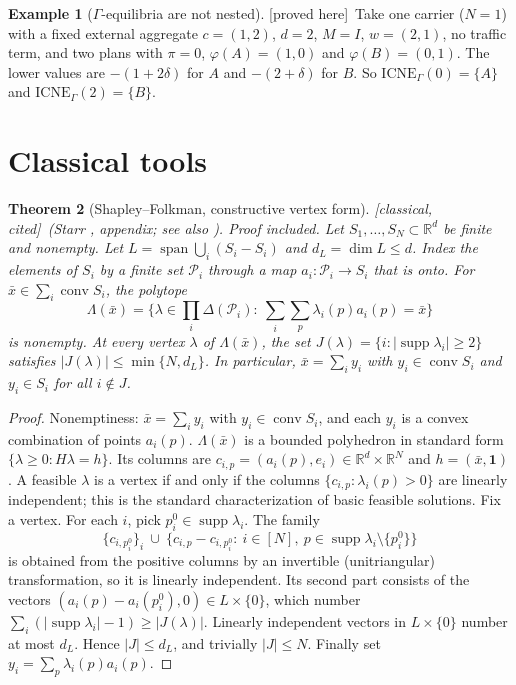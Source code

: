 \documentclass[11pt]{article}
\newtheorem{theorem}{Theorem}[section]
\theoremstyle{definition}
\newtheorem{example}[theorem]{Example}
\theoremstyle{remark}
\newcommand{\R}{\mathbb{R}}
\newcommand{\cP}{\mathcal{P}}
\newcommand{\conv}{\operatorname{conv}}
\newcommand{\spn}{\operatorname{span}}
\newcommand{\supp}{\operatorname{supp}}
\newcommand{\ICNE}{\mathrm{ICNE}}
\newcommand{\PROVED}{\textsf{[proved here]}}
\newcommand{\CLASSICAL}{\textsf{[classical, cited]}}
\begin{document}
\begin{example}[$\Gamma$-equilibria are not nested]\label{ex:gamma} \PROVED\
Take one carrier ($N=1$) with a fixed external aggregate $c=(1,2)$, $d=2$, $M=I$, $w=(2,1)$, no traffic term, and two plans with $\pi=0$, $\varphi(A)=(1,0)$ and $\varphi(B)=(0,1)$. The lower values are $-(1+2\delta)$ for $A$ and $-(2+\delta)$ for $B$. So $\ICNE_\Gamma(0)=\{A\}$ and $\ICNE_\Gamma(2)=\{B\}$.
\end{example}

\section{Classical tools}\label{sec:tools}

\begin{theorem}[Shapley--Folkman, constructive vertex form]\label{thm:sf} \CLASSICAL\ (Starr \cite{Starr69}, appendix; see also \cite{Zhou93,UB16}). Proof included.
Let $S_1,\dots,S_N\subset\R^d$ be finite and nonempty. Let $L=\spn\bigcup_i(S_i-S_i)$ and $d_L=\dim L\le d$. Index the elements of $S_i$ by a finite set $\cP_i$ through a map $a_i:\cP_i\to S_i$ that is onto. For $\bar x\in\sum_i\conv S_i$, the polytope
\[\Lambda(\bar x)=\Big\{\lambda\in\textstyle\prod_i\Delta(\cP_i):\ \sum_i\sum_{p}\lambda_i(p)a_i(p)=\bar x\Big\}\]
is nonempty. At every vertex $\lambda$ of $\Lambda(\bar x)$, the set $J(\lambda)=\{i:|\supp\lambda_i|\ge2\}$ satisfies $|J(\lambda)|\le\min\{N,d_L\}$. In particular, $\bar x=\sum_iy_i$ with $y_i\in\conv S_i$ and $y_i\in S_i$ for all $i\notin J$.
\end{theorem}
\begin{proof}
Nonemptiness: $\bar x=\sum_iy_i$ with $y_i\in\conv S_i$, and each $y_i$ is a convex combination of points $a_i(p)$. $\Lambda(\bar x)$ is a bounded polyhedron in standard form $\{\lambda\ge0:H\lambda=h\}$. Its columns are $c_{i,p}=(a_i(p),e_i)\in\R^d\times\R^N$ and $h=(\bar x,\mathbf 1)$. A feasible $\lambda$ is a vertex if and only if the columns $\{c_{i,p}:\lambda_i(p)>0\}$ are linearly independent; this is the standard characterization of basic feasible solutions. Fix a vertex. For each $i$, pick $p_i^0\in\supp\lambda_i$. The family
\[\{c_{i,p_i^0}\}_{i}\ \cup\ \{c_{i,p}-c_{i,p_i^0}:\ i\in[N],\ p\in\supp\lambda_i\setminus\{p_i^0\}\}\]
is obtained from the positive columns by an invertible (unitriangular) transformation, so it is linearly independent. Its second part consists of the vectors $(a_i(p)-a_i(p_i^0),0)\in L\times\{0\}$, which number $\sum_i(|\supp\lambda_i|-1)\ge|J(\lambda)|$. Linearly independent vectors in $L\times\{0\}$ number at most $d_L$. Hence $|J|\le d_L$, and trivially $|J|\le N$. Finally set $y_i=\sum_p\lambda_i(p)a_i(p)$.
\end{proof}
\end{document}
